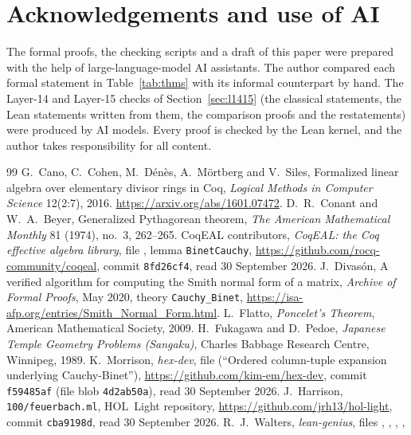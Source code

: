 \documentclass[11pt]{article}
\theoremstyle{definition}
\theoremstyle{remark}
\begin{document}
\section*{Acknowledgements and use of AI}
The formal proofs, the checking scripts and a draft of this paper were prepared with the help of
large-language-model AI assistants. The author compared each formal statement in
Table~\ref{tab:thms} with its informal counterpart by hand. The Layer-14 and Layer-15 checks of
Section~\ref{sec:l1415} (the classical statements, the Lean statements written from them, the
comparison proofs and the restatements) were produced by AI models. Every proof is checked by the Lean
kernel, and the author takes responsibility for all content.

\begin{thebibliography}{99}
 G.~Cano, C.~Cohen, M.~D\'en\`es, A.~M\"ortberg and V.~Siles, Formalized linear
algebra over elementary divisor rings in Coq, \emph{Logical Methods in Computer Science} 12(2:7),
2016. \url{https://arxiv.org/abs/1601.07472}.
 D.~R.~Conant and W.~A.~Beyer, Generalized Pythagorean theorem, \emph{The
American Mathematical Monthly} 81 (1974), no.~3, 262--265.
 CoqEAL contributors, \emph{CoqEAL: the Coq effective algebra library}, file
, lemma \texttt{BinetCauchy}, \url{https://github.com/rocq-community/coqeal},
commit \texttt{8fd26cf4}, read 30 September 2026.
 J.~Divas\'on, A verified algorithm for computing the Smith normal form of a
matrix, \emph{Archive of Formal Proofs}, May 2020, theory \texttt{Cauchy\_Binet},
\url{https://isa-afp.org/entries/Smith_Normal_Form.html}.
 L.~Flatto, \emph{Poncelet's Theorem}, American Mathematical Society, 2009.
 H.~Fukagawa and D.~Pedoe, \emph{Japanese Temple Geometry Problems
(Sangaku)}, Charles Babbage Research Centre, Winnipeg, 1989.
 K.~Morrison, \emph{hex-dev}, file 
(``Ordered column-tuple expansion underlying Cauchy-Binet''), \url{https://github.com/kim-em/hex-dev},
commit \texttt{f59485af} (file blob \texttt{4d2ab50a}), read 30 September 2026.
 J.~Harrison, \texttt{100/feuerbach.ml}, HOL~Light repository,
\url{https://github.com/jrh13/hol-light}, commit \texttt{cba9198d}, read 30 September 2026.
 R.~J.~Walters, \emph{lean-genius}, files ,
, , ,

\end{thebibliography}
\end{document}
